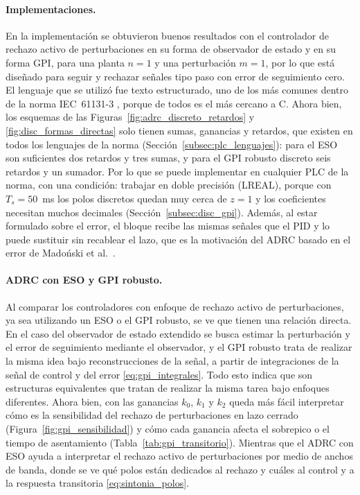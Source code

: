 \paragraph{Implementaciones.} En la implementación se obtuvieron buenos resultados con el controlador
de rechazo activo de perturbaciones en su forma de observador de estado y en su forma GPI, para una
planta $n = 1$ y una perturbación $m = 1$, por lo que está diseñado para seguir y rechazar señales tipo
paso con error de seguimiento cero. El lenguaje que se utilizó fue texto estructurado, uno de los más
comunes dentro de la norma IEC~61131-3 \cite{iec61131}, porque de todos es el más cercano a C. Ahora
bien, los esquemas de las Figuras~\ref{fig:adrc_discreto_retardos} y \ref{fig:disc_formas_directas}
solo tienen sumas, ganancias y retardos, que existen en todos los lenguajes de la norma
(Sección~\ref{subsec:plc_lenguajes}): para el ESO son suficientes dos retardos y tres sumas, y para el
GPI robusto discreto seis retardos y un sumador. Por lo que se puede implementar en cualquier PLC de la norma,
con una condición: trabajar en doble precisión (LREAL), porque con $T_s = 50$~ms los polos discretos
quedan muy cerca de $z = 1$ y los coeficientes necesitan muchos decimales
(Sección~\ref{subsec:disc_gpi}). Además, al estar formulado sobre el error, el bloque recibe las mismas
señales que el PID y lo puede sustituir sin recablear el lazo, que es la motivación del ADRC basado en
el error de Madoński et al.\ \cite{madonski2019general}.

\paragraph{ADRC con ESO y GPI robusto.} Al comparar los controladores con enfoque de rechazo activo de
perturbaciones, ya sea utilizando un ESO o el GPI robusto, se ve que tienen una relación directa. En el caso
del observador de estado extendido se busca estimar la perturbación y el error de seguimiento mediante
el observador, y el GPI robusto trata de realizar la misma idea bajo reconstrucciones de la señal, a partir de
integraciones de la señal de control y del error \eqref{eq:gpi_integrales}. Todo esto indica que son
estructuras equivalentes que tratan de realizar la misma tarea bajo enfoques diferentes. Ahora bien, con las ganancias $k_0$, $k_1$ y $k_2$ queda más
fácil interpretar cómo es la sensibilidad del rechazo de perturbaciones en lazo cerrado
(Figura~\ref{fig:gpi_sensibilidad}) y cómo cada ganancia afecta el sobrepico o el tiempo de
asentamiento (Tabla~\ref{tab:gpi_transitorio}). Mientras que el ADRC con ESO ayuda a interpretar el
rechazo activo de perturbaciones por medio de anchos de banda, donde se ve qué polos están dedicados al
rechazo y cuáles al control y a la respuesta transitoria \eqref{eq:sintonia_polos}.

